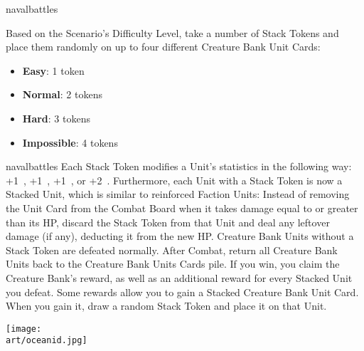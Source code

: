 \begin{expansion}[before=\vspace*{-11mm}]{navalbattles}
\begin{multicols*}{2}
  Based on the Scenario's Difficulty Level, take a number of Stack Tokens and place them randomly on up to four different Creature Bank Unit Cards:
  \begin{itemize}
    \item \textbf{Easy}: 1 token
    \item \textbf{Normal}: 2 tokens
    \item \textbf{Hard}: 3 tokens
    \item \textbf{Impossible}: 4 tokens
  \end{itemize}

  \end{multicols*}
\end{expansion}

\begin{multicols*}{2}
\begin{expansion}[before=\vspace*{-11mm}]{navalbattles}
  Each Stack Token modifies a Unit's statistics in the following way: +1~, +1~, +1~, or +2~.
  Furthermore, each Unit with a Stack Token is now a Stacked Unit, which is similar to reinforced Faction Units: Instead of removing the Unit Card from the Combat Board when it takes damage equal to or greater than its HP, discard the Stack Token from that Unit and deal any leftover damage (if any), deducting it from the new HP.
  Creature Bank Units without a Stack Token are defeated normally.
  After Combat, return all Creature Bank Units back to the Creature Bank Units Cards pile.
  If you win, you claim the Creature Bank's reward, as well as an additional reward for every Stacked Unit you defeat.
  Some rewards allow you to gain a Stacked Creature Bank Unit Card.
  When you gain it, draw a random Stack Token and place it on that Unit.
\end{expansion}
\columnbreak

\texttt{[image: \\art/oceanid.jpg]}

\end{multicols*}
